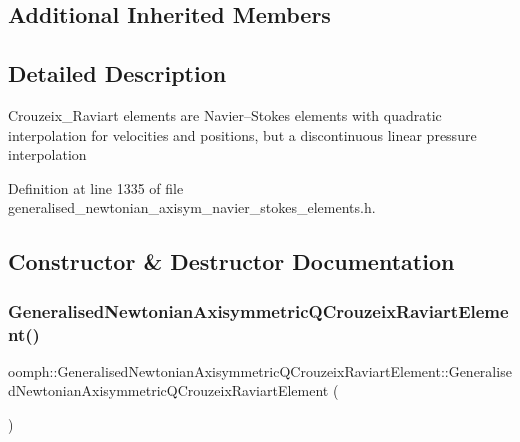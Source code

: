 \subsection*{Additional Inherited Members}


\subsection{Detailed Description}
Crouzeix\+\_\+\+Raviart elements are Navier--Stokes elements with quadratic interpolation for velocities and positions, but a discontinuous linear pressure interpolation 

Definition at line 1335 of file generalised\+\_\+newtonian\+\_\+axisym\+\_\+navier\+\_\+stokes\+\_\+elements.\+h.



\subsection{Constructor \& Destructor Documentation}
\mbox{\label{classoomph_1_1GeneralisedNewtonianAxisymmetricQCrouzeixRaviartElement_aaa144c84efff61d34ba9c5769954d6c8}} 
\subsubsection{\texorpdfstring{Generalised\+Newtonian\+Axisymmetric\+Q\+Crouzeix\+Raviart\+Element()}{GeneralisedNewtonianAxisymmetricQCrouzeixRaviartElement()}}
{\footnotesize\ttfamily oomph\+::\+Generalised\+Newtonian\+Axisymmetric\+Q\+Crouzeix\+Raviart\+Element\+::\+Generalised\+Newtonian\+Axisymmetric\+Q\+Crouzeix\+Raviart\+Element (\begin{DoxyParamCaption}{ }\end{DoxyParamCaption})\hspace{0.3cm}{\ttfamily [inline]}}



